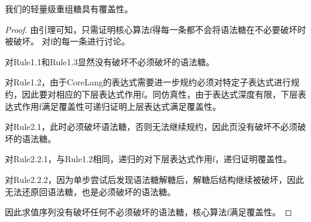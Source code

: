 \begin{mythm}[覆盖性]
	我们的轻量级重组糖具有覆盖性。
\end{mythm}

\begin{proof}
	由引理可知，只需证明核心算法f得每一条都不会将语法糖在不必要破坏时被破坏。
	对f的每一条进行讨论。
	
	对Rule1.1和Rule1.3显然没有破坏不必须破坏的语法糖。
	
	对Rule1.2，由于CoreLang的表达式需要进一步规约必须对特定子表达式进行规约，因此要对相应的下层表达式作用f。同仿真性，由于表达式深度有限，下层表达式作用f满足覆盖性可递归证明上层表达式满足覆盖性。
	
	对Rule2.1，此时必须破坏语法糖，否则无法继续规约，因此页没有破坏不必须破坏的语法糖。
	
	对Rule2.2.1，与Rule1.2相同，递归的对下层表达式作用f，递归证明覆盖性。
	
	对Rule2.2.2，因为单步尝试后发现语法糖解糖后，解糖后结构继续被破坏，因此无法还原回语法糖，也是必须破坏的语法糖。
	
	因此求值序列没有破坏任何不必须破坏的语法糖，核心算法f满足覆盖性。
\end{proof}



